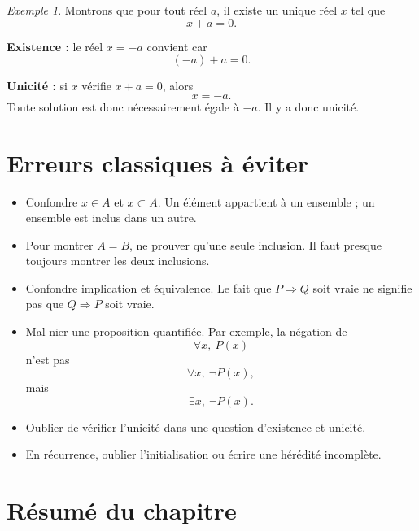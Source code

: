 \documentclass[11pt,a4paper]{article}
\theoremstyle{remark}
\newtheorem{exemple}[definition]{Exemple}
\begin{document}
\begin{exemple}
Montrons que pour tout réel \(a\), il existe un unique réel \(x\) tel que
\[
x+a=0.
\]

\textbf{Existence :} le réel \(x=-a\) convient car
\[
(-a)+a=0.
\]

\textbf{Unicité :} si \(x\) vérifie \(x+a=0\), alors
\[
x=-a.
\]
Toute solution est donc nécessairement égale à \(-a\). Il y a donc unicité.
\end{exemple}

\section{Erreurs classiques à éviter}

\begin{itemize}
    \item Confondre \(x\in A\) et \(x\subset A\).  
    Un élément appartient à un ensemble ; un ensemble est inclus dans un autre.
    
    \item Pour montrer \(A=B\), ne prouver qu’une seule inclusion.  
    Il faut presque toujours montrer les deux inclusions.

    \item Confondre implication et équivalence.  
    Le fait que \(P\Longrightarrow Q\) soit vraie ne signifie pas que \(Q\Longrightarrow P\) soit vraie.

    \item Mal nier une proposition quantifiée.  
    Par exemple, la négation de
    \[
    \forall x,\ P(x)
    \]
    n’est pas
    \[
    \forall x,\ \neg P(x),
    \]
    mais
    \[
    \exists x,\ \neg P(x).
    \]

    \item Oublier de vérifier l’unicité dans une question d’existence et unicité.

    \item En récurrence, oublier l’initialisation ou écrire une hérédité incomplète.
\end{itemize}

\section{Résumé du chapitre}
\end{document}
